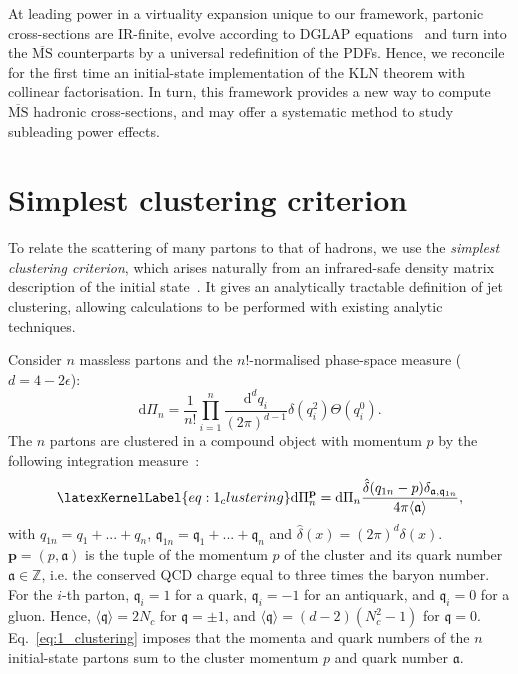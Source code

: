 \documentclass[%
 reprint,
 amsmath,amssymb,
 superscriptaddress,
 aps,
 preprintnumbers,
prl,
floatfix,
]{revtex4-2}
\let\label\latexKernelLabel
\begin{document}
At leading power in a virtuality expansion unique to our framework, partonic cross-sections are IR-finite, evolve according to DGLAP equations~\cite{Altarelli:1977zs,Dokshitzer:1977sg,Gribov:1968ia,Gribov:1972ri} and turn into the $\overline{\text{MS}}$ counterparts by a universal redefinition of the PDFs. Hence, we reconcile for the first time an initial-state implementation of the KLN theorem with collinear factorisation.
In turn, this framework provides a new way to compute $\overline{\text{MS}}$ hadronic cross-sections, and may offer a systematic method to study subleading power effects.

\section{Simplest clustering criterion}
\label{sec:clustering}

To relate the scattering of many partons to that of hadrons, we use the \emph{simplest clustering criterion}, which arises naturally from an infrared-safe density matrix description of the initial state~\cite{Capatti:2025gqj}.
It gives an analytically tractable definition of jet clustering, allowing calculations to be performed with existing analytic techniques.

Consider $n$ massless partons and the $n!$-normalised phase-space measure ($d=4-2\epsilon$):
\begin{equation}
\mathrm{d}\Pi_n=\frac{1}{n!}\prod_{i=1}^{n} \frac{\mathrm{d}^d q_i}{(2\pi)^{d-1}} \delta(q_i^2)\Theta(q_i^0).
\end{equation}
The $n$ partons are clustered in a compound object with momentum $p$ by the following integration measure~\cite{Capatti:2025gqj}:
\begin{equation}
\label{eq:1_clustering}
\mathrm{d}\Pi_n^\mathbf{p}=\mathrm{d}\Pi_n\frac{\hat{\delta}(q_{1n}-p)\delta_{\mathfrak{a},\mathfrak{q}_{1n}}}{4\pi\langle\mathfrak{a}\rangle},
\end{equation}
with $q_{1n}=q_1+...+q_n$, $\mathfrak{q}_{1n}=\mathfrak{q}_1+...+\mathfrak{q}_n$ and $\hat{\delta}(x)=(2\pi)^d \delta(x)$.
$\mathbf{p}=(p,\mathfrak{a})$ is the tuple of the momentum $p$ of the cluster and its quark number $\mathfrak{a}\in\mathbb{Z}$, i.e. the conserved QCD
charge equal to three times the baryon number.
For the $i$-th parton, $\mathfrak{q}_i=1$ for a quark,
$\mathfrak{q}_i=-1$ for an antiquark, and $\mathfrak{q}_i=0$
for a gluon.
Hence, $\langle\mathfrak{q}\rangle=2N_c$ for $\mathfrak{q}= \pm 1$, and $\langle\mathfrak{q}\rangle=(d-2)(N_c^2-1)$ for $\mathfrak{q}=0$.
Eq.~\eqref{eq:1_clustering} imposes that the momenta and quark numbers of the $n$ initial-state partons sum to the cluster momentum $p$ and quark number $\mathfrak{a}$.
\end{document}
